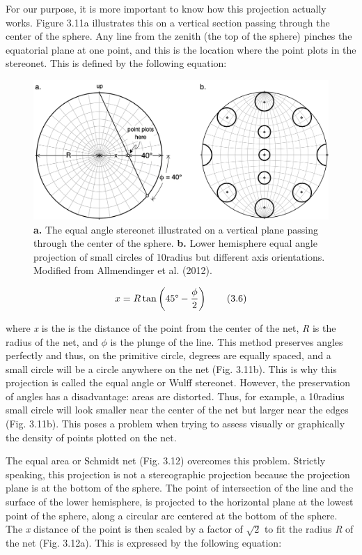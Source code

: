 \documentclass[a4paper , 12pt]{book}
\begin{document}
For our purpose, it is more important to know how this projection actually works. Figure 3.11a illustrates this on a vertical section passing through the center of the sphere. Any line from the zenith (the top of the sphere) pinches the equatorial plane at one point, and this is the location where the point plots in the stereonet. This is defined by the following equation:

\begin{figure}[ht]
    \centering
    \includegraphics[width=13cm]{Figures/ch3f11.png}
    \caption{\textbf{a.} The equal angle stereonet illustrated on a vertical plane passing through the center of the sphere. \textbf{b.} Lower hemisphere equal angle projection of small circles of 10\degree radius but different axis orientations. Modified from Allmendinger et al. (2012).}
\end{figure}

\begin{equation}
    x = R\tan\left(45\degree-\frac{\phi}{2}\right) \tag{3.6}
\end{equation}

where \textit{x} is the is the distance of the point from the center of the net, \textit{R} is the radius of the net, and $\phi$ is the plunge of the line. This method preserves angles perfectly and thus, on the primitive circle, degrees are equally spaced, and a small circle will be a circle anywhere on the net (Fig. 3.11b). This is why this projection is called the equal angle or Wulff stereonet. However, the preservation of angles has a disadvantage: areas are distorted. Thus, for example, a 10\degree radius small circle will look smaller near the center of the net but larger near the edges (Fig. 3.11b). This poses a problem when trying to assess visually or graphically the density of points plotted on the net.

The equal area or Schmidt net (Fig. 3.12) overcomes this problem. Strictly speaking, this projection is not a stereographic projection because the projection plane is at the bottom of the sphere. The point of intersection of the line and the surface of the lower hemisphere, is projected to the horizontal plane at the lowest point of the sphere, along a circular arc centered at the bottom of the sphere. The \textit{x} distance of the point is then scaled by a factor of $\sqrt{2}$ to fit the radius \textit{R} of the net (Fig. 3.12a). This is expressed by the following equation:
\end{document}
